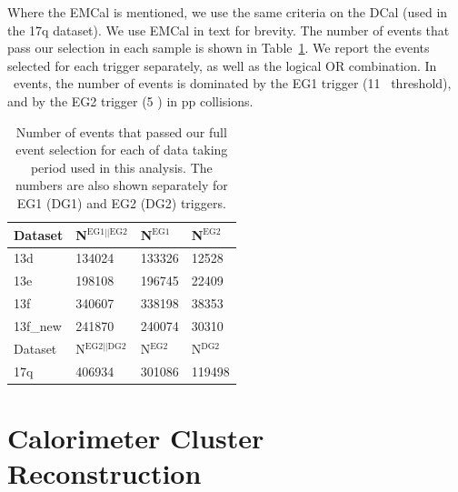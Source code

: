 Where the EMCal is mentioned, we use the same criteria on the DCal (used in the 17q dataset). We use EMCal in text for brevity.
The number of events that pass our selection in each sample is shown in Table~\ref{tab:eventsselected}. We report the events selected for each trigger separately, as well as the logical OR combination. In \pPb~events, the number of events is dominated by the EG1 trigger (11 \GeVc~threshold), and by the EG2 trigger (5 \GeVc) in pp collisions. 

\begin{table}[h]
   \centering
   \caption{Number of events that passed our full event selection for each of data taking period used in this analysis. The numbers are also shown separately for EG1 (DG1) and EG2 (DG2) triggers.}
   \label{tab:eventsselected}
   \begin{tabular*}{1.0\columnwidth}{@{\extracolsep{\fill}}llll@{}}
    \hline
    Dataset &  	N$^{\mathrm{EG1||EG2}}$ &	N$^{\mathrm{EG1}}$ & N$^{\mathrm{EG2}}$\\
    \hline
    13d &	134024 & 133326 & 12528\\
    13e &	198108 & 196745 & 22409\\
    13f &   340607 & 338198 & 38353\\
    13f\_new & 241870 & 240074 & 30310\\
    \hline
    Dataset &	N$^{\mathrm{EG2 || DG2}}$ &		N$^{\mathrm{EG2}}$ & N$^{\mathrm{DG2}}$\\
    \hline

    17q & 406934 & 301086 & 119498 \\
 
    \hline
   \end{tabular*}
\end{table}

\section{Calorimeter Cluster Reconstruction}
\label{sec:clusterselection}
